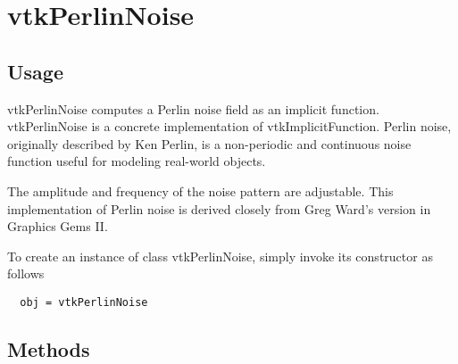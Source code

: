 \section{vtkPerlinNoise}

\subsection{Usage}

 vtkPerlinNoise computes a Perlin noise field as an implicit function.
 vtkPerlinNoise is a concrete implementation of vtkImplicitFunction.
 Perlin noise, originally described by Ken Perlin, is a non-periodic and
 continuous noise function useful for modeling real-world objects.

 The amplitude and frequency of the noise pattern are adjustable.  This
 implementation of Perlin noise is derived closely from Greg Ward's version
 in Graphics Gems II.

To create an instance of class vtkPerlinNoise, simply
invoke its constructor as follows
\begin{verbatim}
  obj = vtkPerlinNoise
\end{verbatim}
\subsection{Methods}

